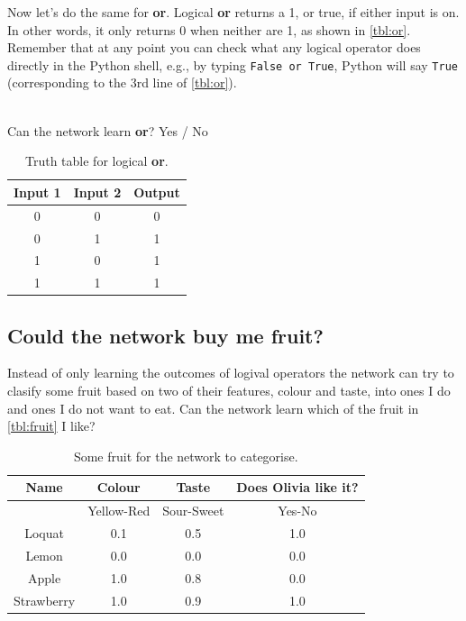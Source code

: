 \documentclass[a4paper,10pt]{article}
\begin{document}
Now let's do the same for \textbf{or}. Logical \textbf{or} returns a 1, or true, if either input is on. In other words, it only returns 0 when neither are 1, as shown in \autoref{tbl:or}. Remember that at any point you can check what any logical operator does directly in the Python shell, e.g., by typing \texttt{False or True}, Python will say \texttt{True} (corresponding to the 3rd line of \autoref{tbl:or}).

\ \\ Can the network learn \textbf{or}?    Yes / No                                             

\begin{table}[ht]
 \centering
 \begin{tabular}[t]{ccc}
Input 1 & Input 2 & Output\\ \hline
0 & 0 & 0\\
0 & 1 & 1 \\
1 & 0 & 1 \\
1 & 1 & 1 \\

\end{tabular} \caption{Truth table for logical \textbf{or}.}
 \label{tbl:or}
\end{table}

\subsection{Could the network buy me fruit?}
 Instead of only learning the outcomes of logival operators the network can try to clasify some fruit based on two of their features, colour and taste, into ones I do and ones I do not want to eat. Can the network learn which of the fruit in \autoref{tbl:fruit} I like?
 



\begin{table}[ht]
 \centering
 \begin{tabular}[t]{cccc}
Name & Colour &  Taste & Does Olivia like it? \\ \hline
& Yellow-Red & Sour-Sweet & Yes-No \\ \hline
Loquat & 0.1 & 0.5 & 1.0 \\
Lemon & 0.0 &  0.0 & 0.0 \\
Apple & 1.0 &  0.8 & 0.0 \\
Strawberry & 1.0 &  0.9 & 1.0 \\
   
\end{tabular} \caption{Some fruit for the network to categorise.}
 \label{tbl:fruit}
\end{table}
\end{document}
